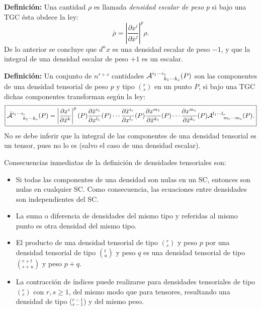  \textbf{Definición:} Una cantidad $\rho$ es llamada \textit{densidad escalar
 de peso} $p$ si bajo una TGC ésta obdece la ley:
 \begin{equation}
 \bar{\rho}=\left| \frac{\partial x^i}{\partial\bar{x}^j}\right|^p%
 \rho. \label{den6}%
 \end{equation}
 De lo anterior se concluye que $d^nx$ es una densidad escalar de peso $-1$,
 y que la integral de una densidad escalar de peso $+1$ es un escalar.

 \textbf{Definición:} Un conjunto de $n^{r+s}$ cantidades ${\cal A}_{\ \ \ \ \
 k_1\cdots k_{s}}^{i_1\cdots i_{r}}(P)$ son las componentes de una densidad
 tensorial de peso $p$ y tipo $(^r_s)$ en un punto $P$, si bajo una TGC dichas
 componentes transforman según la ley:
 \begin{equation}
 \boxed{\bar{{\cal A}}_{\ \ \ \ \ k_1\cdots k_{s}}^{i_1\cdots
 i_{r}}(P)=\left| \frac{\partial
 x^i}{\partial\bar{x}^k}\right|^p(P) \frac{\partial\bar{x}^{i_1}%
}{\partial x^{l_1}}(P)\cdots \frac{\partial\bar{x}^{i_{r}}}{\partial
 x^{l_{r}}}(P)\frac{\partial x^{m_1}}{\partial\bar{x}^{k_1}}(P)\cdots
 \frac{\partial x^{m_{s}}}{\partial\bar{x}^{k_{s}}}(P){\cal A}_{\ \ \ \ \
 m_1\cdots m_{s}}^{l_1\cdots l_{r}}(P).}
 \label{den7}%
 \end{equation}
 No se debe inferir que la integral de las componentes de una densidad
 tensorial es un tensor, pues no lo es (salvo el caso de una densidad escalar).

 Consecuencias inmediatas de la definición de densidades tensoriales son:
 \begin{itemize}
 \item Si todas las componentes de una densidad son nulas en un SC, entonces
 son nulas en cualquier SC. Como consecuencia, las ecuaciones entre densidades
 son independientes del SC.
 \item La suma o diferencia de densidades del mismo tipo y referidas al mismo
 punto es otra densidad del mismo tipo.
 \item El producto de una densidad tensorial de tipo $(^r_s)$ y peso $p$ por
 una densidad tensorial de tipo $(^t_u)$ y peso $q$ es una densidad tensorial
 de tipo $(^{r+t}_{s+u})$ y peso $p+q$.
 \item La contracción de índices puede realizarse para densidades
 tensoriales de tipo $(^r_s)$ con $r,s\geq1$, del mismo modo que para tensores,
 resultando una densidad de tipo ($_{s-1}^{r-1}$) y del mismo peso.
 \end{itemize}

